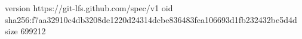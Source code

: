 version https://git-lfs.github.com/spec/v1
oid sha256:f7aa32910c4db3208de1220d24314dcbe836483fea106693d1fb232432be5d4d
size 699212
